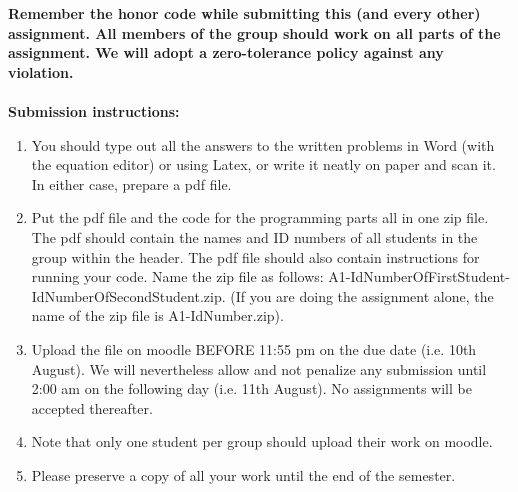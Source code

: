 \documentclass[11pt]{article}
\begin{document}
\maketitle

\textbf{Remember the honor code while submitting this (and every other) assignment. All members of the group should work on all parts of the assignment. We will adopt a \textbf{zero-tolerance policy} against any violation.}
\\
\\
\textbf{Submission instructions:} 
\begin{enumerate}
\item You should type out all the answers to the written problems in Word (with the equation editor) or using Latex, or write it neatly on paper and scan it. In either case, prepare a pdf file. 
\item Put the pdf file and the code for the programming parts all in one zip file. The pdf should contain the names and ID numbers of all students in the group within the header. The pdf file should also contain instructions for running your code. Name the zip file as follows: A1-IdNumberOfFirstStudent-IdNumberOfSecondStudent.zip. (If you are doing the assignment alone, the name of the zip file is A1-IdNumber.zip). 
\item Upload the file on moodle BEFORE 11:55 pm on the due date (i.e. 10th August). We will nevertheless allow and not penalize any submission until 2:00 am on the following day (i.e. 11th August). No assignments will be accepted thereafter. 
\item Note that only one student per group should upload their work on moodle. 
\item Please preserve a copy of all your work until the end of the semester. 
\end{enumerate}
\end{document}
